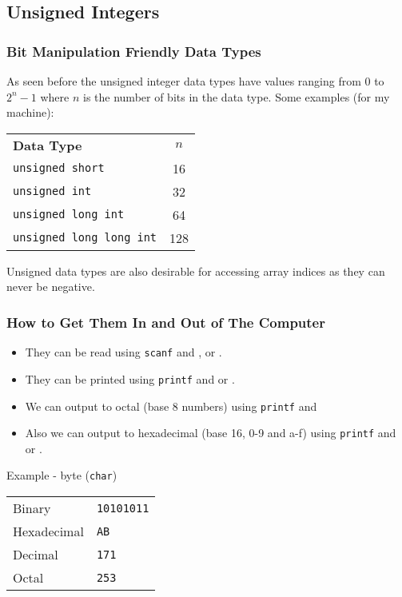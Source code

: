 \documentclass[smaller,table]{beamer} %
\begin{document}
\subsection{Unsigned Integers}
\begin{frame}
\frametitle{Bit Manipulation Friendly Data Types}
As seen before the unsigned integer data types have values ranging from 0 to $2^n-1$ where $n$ is the number of bits in the data type. Some examples (for my machine):
\begin{center}
\begin{tabular}{l c}
\bf Data Type&\bf$n$\\
\tt unsigned short& 16\\
\tt unsigned int&32\\
\tt unsigned long int&64\\
\tt unsigned long long int&128
\end{tabular}
\end{center}
Unsigned data types are also desirable for accessing array indices as they can never be negative.
\end{frame}

\begin{frame}
\frametitle{How to Get Them In and Out of The Computer}
\begin{itemize}
\item They can be read using {\tt scanf} and {\tt {}}, {\tt {}}
 or {\tt {}}.
\item They can be printed using {\tt printf} and {\tt {}} or {\tt {}}.
\item We can output to octal (base 8 numbers) using {\tt printf} and {\tt {}}
\item Also we can output to hexadecimal (base 16, 0-9 and a-f) using {\tt printf} and {\tt {}} or {\tt {}}.
\end{itemize}
\begin{block}{Example - byte ({\tt char})}
\begin{tabular}{l l}
Binary&\tt10101011\\
Hexadecimal&\tt AB\\
Decimal&\tt171\\
Octal&\tt253
\end{tabular}
\end{block}
\end{frame}
\end{document}
